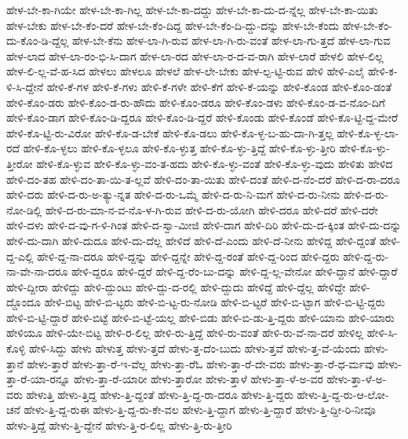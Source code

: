 {ಹೇಳ-ಬೇ-ಕಾ-ಗಿಯೇ
ಹೇಳ-ಬೇ-ಕಾ-ಗಿಲ್ಲ
ಹೇಳ-ಬೇ-ಕಾ-ದದ್ದು
ಹೇಳ-ಬೇ-ಕಾ-ದು-ದ-ನ್ನೆಲ್ಲ
ಹೇಳ-ಬೇ-ಕಾ-ಯಿತು
ಹೇಳ-ಬೇಕು
ಹೇಳ-ಬೇ-ಕೆಂ-ದರೆ
ಹೇಳ-ಬೇ-ಕೆಂ-ದಿದ್ದ
ಹೇಳ-ಬೇ-ಕೆಂ-ದಿ-ದ್ದು-ದನ್ನು
ಹೇಳ-ಬೇ-ಕೆಂದು
ಹೇಳ-ಬೇ-ಕೆಂ-ದು-ಕೊಂ-ಡಿ-ದ್ದೆಲ್ಲ
ಹೇಳ-ಬೇ-ಕೆನು
ಹೇಳ-ಲಾ-ಗಿ-ರುವ
ಹೇಳ-ಲಾ-ಗಿ-ರು-ವಂತೆ
ಹೇಳ-ಲಾ-ಗು-ತ್ತದೆ
ಹೇಳ-ಲಾ-ಗುವ
ಹೇಳ-ಲಾದ
ಹೇಳ-ಲಾ-ರಂ-ಭಿ-ಸಿ-ದಾಗ
ಹೇಳ-ಲಾ-ರದ
ಹೇಳ-ಲಾ-ರ-ದ-ವ-ರಾಗಿ
ಹೇಳ-ಲಾರೆ
ಹೇಳಲಿ
ಹೇಳ-ಲಿಲ್ಲ
ಹೇಳ-ಲಿ-ಲ್ಲ-ವೆ-ಹ-ಸಿದ
ಹೇಳಲು
ಹೇಳಲೂ
ಹೇಳಲೆ
ಹೇಳ-ಲೇ-ಬೇಕು
ಹೇಳ-ಲ್ಪ-ಟ್ಟಿ-ರುವ
ಹೇಳಿ
ಹೇಳಿ-ಎಲೈ
ಹೇಳಿ-ಕ-ಳಿ-ಸಿ-ದ್ದೇನೆ
ಹೇಳಿ-ಕೆ-ಗಳ
ಹೇಳಿ-ಕೆ-ಗಳು
ಹೇಳಿ-ಕೆ-ಗಳೇ
ಹೇಳಿ-ಕೆಗೆ
ಹೇಳಿ-ಕೆ-ಯನ್ನು
ಹೇಳಿ-ಕೊಂಡ
ಹೇಳಿ-ಕೊಂ-ಡಂತೆ
ಹೇಳಿ-ಕೊಂ-ಡರು
ಹೇಳಿ-ಕೊಂ-ಡ-ರು-ಹೌದು
ಹೇಳಿ-ಕೊಂ-ಡರೂ
ಹೇಳಿ-ಕೊಂ-ಡಳು
ಹೇಳಿ-ಕೊಂ-ಡ-ವ-ನೊಂ-ದಿಗೆ
ಹೇಳಿ-ಕೊಂ-ಡಾಗ
ಹೇಳಿ-ಕೊಂ-ಡಿ-ದ್ದರೂ
ಹೇಳಿ-ಕೊಂ-ಡಿ-ದ್ದರೆ
ಹೇಳಿ-ಕೊಂಡು
ಹೇಳಿ-ಕೊಂಡೆ
ಹೇಳಿ-ಕೊ-ಟ್ಟಿ-ದ್ದ-ಮೇರೆ
ಹೇಳಿ-ಕೊ-ಟ್ಟಿ-ರು-ವಿರೋ
ಹೇಳಿ-ಕೊ-ಡ-ಬೇಕೆ
ಹೇಳಿ-ಕೊ-ಡಲು
ಹೇಳಿ-ಕೊ-ಳ್ಳ-ಬ-ಹು-ದಾ-ಗಿ-ತ್ತಲ್ಲ
ಹೇಳಿ-ಕೊ-ಳ್ಳ-ಲಾ-ರದೆ
ಹೇಳಿ-ಕೊ-ಳ್ಳಲು
ಹೇಳಿ-ಕೊ-ಳ್ಳಲೂ
ಹೇಳಿ-ಕೊ-ಳ್ಳುತ್ತ
ಹೇಳಿ-ಕೊ-ಳ್ಳು-ತ್ತಿದ್ದೆ
ಹೇಳಿ-ಕೊ-ಳ್ಳು-ತ್ತೀರಿ
ಹೇಳಿ-ಕೊ-ಳ್ಳು-ತ್ತೀರೋ
ಹೇಳಿ-ಕೊ-ಳ್ಳುವ
ಹೇಳಿ-ಕೊ-ಳ್ಳು-ವಂ-ತ-ಹದು
ಹೇಳಿ-ಕೊ-ಳ್ಳು-ವಂತೆ
ಹೇಳಿ-ಕೊ-ಳ್ಳು-ವುದು
ಹೇಳಿತು
ಹೇಳಿದ
ಹೇಳಿ-ದಂ-ತಹ
ಹೇಳಿ-ದಂ-ತಾ-ಯಿ-ತ-ಲ್ಲವೆ
ಹೇಳಿ-ದಂ-ತಾ-ಯಿತು
ಹೇಳಿ-ದಂತೆ
ಹೇಳಿ-ದ-ನೆಂ-ದರೆ
ಹೇಳಿ-ದ-ರಾ-ದರೂ
ಹೇಳಿ-ದರು
ಹೇಳಿ-ದ-ರು-ಅ-ತ್ಯು-ನ್ನತ
ಹೇಳಿ-ದ-ರು-ಒಮ್ಮೆ
ಹೇಳಿ-ದ-ರು-ನಿ-ಮಗೆ
ಹೇಳಿ-ದ-ರು-ನೀನು
ಹೇಳಿ-ದ-ರು-ನೋ-ಡಿಲ್ಲಿ
ಹೇಳಿ-ದ-ರು-ಮಾ-ನ-ವ-ನೊ-ಳ-ಗಿ-ರುವ
ಹೇಳಿ-ದ-ರು-ಯೋಗಿ
ಹೇಳಿ-ದರೂ
ಹೇಳಿ-ದರೆ
ಹೇಳಿ-ದರೇ
ಹೇಳಿ-ದಳು
ಹೇಳಿ-ದ-ವು-ಗ-ಳಿ-ಗಿಂತ
ಹೇಳಿ-ದ-ಸ್ವಾ-ಮೀಜಿ
ಹೇಳಿ-ದಾಗ
ಹೇಳಿ-ದಿರಿ
ಹೇಳಿ-ದು-ದ-ಕ್ಕಿಂತ
ಹೇಳಿ-ದು-ದನ್ನು
ಹೇಳಿ-ದು-ದಾಗಿ
ಹೇಳಿ-ದುದೂ
ಹೇಳಿ-ದು-ದೆಲ್ಲ
ಹೇಳಿದೆ
ಹೇಳಿ-ದೆ-ಎಂದು
ಹೇಳಿ-ದೆ-ನೀನು
ಹೇಳಿದ್ದ
ಹೇಳಿ-ದ್ದಂತೆ
ಹೇಳಿ-ದ್ದ-ಎಲ್ಲಿ
ಹೇಳಿ-ದ್ದ-ನಾ-ದರೂ
ಹೇಳಿ-ದ್ದನ್ನು
ಹೇಳಿ-ದ್ದನ್ನೇ
ಹೇಳಿ-ದ್ದ-ರಂತೆ
ಹೇಳಿ-ದ್ದ-ರಿಂದ
ಹೇಳಿ-ದ್ದರು
ಹೇಳಿ-ದ್ದ-ರು-ನಾ-ವೇ-ನಾ-ದರೂ
ಹೇಳಿ-ದ್ದರೂ
ಹೇಳಿ-ದ್ದರೆ
ಹೇಳಿ-ದ್ದ-ರೆಂ-ಬು-ದನ್ನು
ಹೇಳಿ-ದ್ದ-ಲ್ಲ-ವೇನೋ
ಹೇಳಿ-ದ್ದಾನೆ
ಹೇಳಿ-ದ್ದಾರೆ
ಹೇಳಿ-ದ್ದೀರಾ
ಹೇಳಿದ್ದು
ಹೇಳಿ-ದ್ದುಂಟು
ಹೇಳಿ-ದ್ದು-ದ-ರಲ್ಲಿ
ಹೇಳಿ-ದ್ದುದು
ಹೇಳಿದ್ದೆ
ಹೇಳಿ-ದ್ದೆಲ್ಲ
ಹೇಳಿದ್ದೇ
ಹೇಳಿ-ದ್ದೊಂದೂ
ಹೇಳಿ-ಬಿಟ್ಟ
ಹೇಳಿ-ಬಿ-ಟ್ಟರು
ಹೇಳಿ-ಬಿ-ಟ್ಟ-ರು-ನೋಡಿ
ಹೇಳಿ-ಬಿ-ಟ್ಟರೆ
ಹೇಳಿ-ಬಿ-ಟ್ಟಾಗ
ಹೇಳಿ-ಬಿ-ಟ್ಟಿ-ದ್ದರು
ಹೇಳಿ-ಬಿ-ಟ್ಟಿ-ದ್ದಾರೆ
ಹೇಳಿ-ಬಿಟ್ಟೆ
ಹೇಳಿ-ಬಿ-ಟ್ಟೆ-ಯಲ್ಲ
ಹೇಳಿ-ಬಿಡು
ಹೇಳಿ-ಬಿ-ಡು-ತ್ತಿ-ದ್ದರು
ಹೇಳಿ-ಯಾನು
ಹೇಳಿ-ಯಾರು
ಹೇಳಿಯೂ
ಹೇಳಿ-ಯೇ-ಬಿಟ್ಟ
ಹೇಳಿ-ರ-ಲಿಲ್ಲ
ಹೇಳಿ-ರು-ತ್ತಿದ್ದೆ
ಹೇಳಿ-ರು-ವಂತೆ
ಹೇಳಿ-ರು-ವೆ-ನಾ-ದರೆ
ಹೇಳಿಲ್ಲ
ಹೇಳಿ-ಸಿ-ಕೊಳ್ಳಿ
ಹೇಳಿ-ಸಿದ್ದು
ಹೇಳು
ಹೇಳುತ್ತ
ಹೇಳು-ತ್ತದೆ
ಹೇಳು-ತ್ತ-ದೆಂ-ಬುದು
ಹೇಳು-ತ್ತವೆ
ಹೇಳು-ತ್ತ-ವೆ-ಯೆಂದು
ಹೇಳು-ತ್ತಾನೆ
ಹೇಳು-ತ್ತಾರೆ
ಹೇಳು-ತ್ತಾ-ರೆ-ಇ-ವೆಲ್ಲ
ಹೇಳು-ತ್ತಾ-ರೆಓ
ಹೇಳು-ತ್ತಾ-ರೆ-ದೇ-ವರು
ಹೇಳು-ತ್ತಾ-ರೆ-ಧ-ರ್ಮವು
ಹೇಳು-ತ್ತಾ-ರೆ-ಯಾ-ರನ್ನೂ
ಹೇಳು-ತ್ತಾ-ರೆ-ಯಾರೀ
ಹೇಳು-ತ್ತಾರೋ
ಹೇಳು-ತ್ತಾಳೆ
ಹೇಳು-ತ್ತಾ-ಳೆ-ಅ-ವರ
ಹೇಳು-ತ್ತಾ-ಳೆ-ಅ-ವರು
ಹೇಳುತ್ತಿ
ಹೇಳು-ತ್ತಿದ್ದ
ಹೇಳು-ತ್ತಿ-ದ್ದಂತೆ
ಹೇಳು-ತ್ತಿ-ದ್ದ-ರಾ-ದರೂ
ಹೇಳು-ತ್ತಿ-ದ್ದರು
ಹೇಳು-ತ್ತಿ-ದ್ದ-ರು-ಆ-ಲೋ-ಚನೆ
ಹೇಳು-ತ್ತಿ-ದ್ದ-ರುಈ
ಹೇಳು-ತ್ತಿ-ದ್ದ-ರು-ಕೇ-ವಲ
ಹೇಳು-ತ್ತಿ-ದ್ದಾಗ
ಹೇಳು-ತ್ತಿ-ದ್ದಾರೆ
ಹೇಳು-ತ್ತಿ-ದ್ದೀ-ರಿ-ನೀವೂ
ಹೇಳು-ತ್ತಿದ್ದೆ
ಹೇಳು-ತ್ತಿ-ದ್ದೇನೆ
ಹೇಳು-ತ್ತಿ-ರ-ಲಿಲ್ಲ
ಹೇಳು-ತ್ತಿ-ರು-ತ್ತೀರಿ
}
